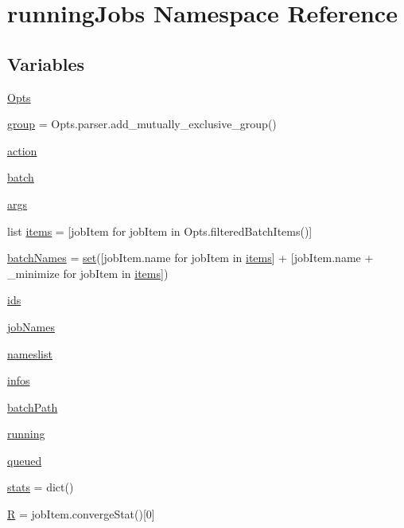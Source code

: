 \hypertarget{namespacerunningJobs}{}\section{running\+Jobs Namespace Reference}
\label{namespacerunningJobs}
\subsection*{Variables}
\begin{DoxyCompactItemize}
\item 
\mbox{\hyperlink{namespacerunningJobs_af3294b73085a8cb379dd4f4a1ff77e1d}{Opts}}
\item 
\mbox{\hyperlink{namespacerunningJobs_a67805e8e0caf8c83496d48a96a06c65c}{group}} = Opts.\+parser.\+add\+\_\+mutually\+\_\+exclusive\+\_\+group()
\item 
\mbox{\hyperlink{namespacerunningJobs_adb058c43d244d0c62dbb4644d85609f1}{action}}
\item 
\mbox{\hyperlink{namespacerunningJobs_a41e81dd05c6ed4532bee5f6630160945}{batch}}
\item 
\mbox{\hyperlink{namespacerunningJobs_a498f2bd71b059a02b3791d5460fed76c}{args}}
\item 
list \mbox{\hyperlink{namespacerunningJobs_ac0608775f65edaa0cff43929a4c7940c}{items}} = \mbox{[}job\+Item for job\+Item in Opts.\+filtered\+Batch\+Items()\mbox{]}
\item 
\mbox{\hyperlink{namespacerunningJobs_a1558158965c9e843da4e4a60ed52a80e}{batch\+Names}} = \mbox{\hyperlink{plotTT_8m_ae2445b699d1845d6abd1418ca39394c0}{set}}(\mbox{[}job\+Item.\+name for job\+Item in \mbox{\hyperlink{namespacerunningJobs_ac0608775f65edaa0cff43929a4c7940c}{items}}\mbox{]} + \mbox{[}job\+Item.\+name + \textquotesingle{}\+\_\+minimize\textquotesingle{} for job\+Item in \mbox{\hyperlink{namespacerunningJobs_ac0608775f65edaa0cff43929a4c7940c}{items}}\mbox{]})
\item 
\mbox{\hyperlink{namespacerunningJobs_a677f12e80dce0689acf714d0135bd618}{ids}}
\item 
\mbox{\hyperlink{namespacerunningJobs_a0a0a08b270feb5c19bc21bfcd276ee9f}{job\+Names}}
\item 
\mbox{\hyperlink{namespacerunningJobs_ac9fe5d5b9c8e3a015df8424ca0dc772a}{nameslist}}
\item 
\mbox{\hyperlink{namespacerunningJobs_a28cc6ccb0472b73ec42776156dbff2dc}{infos}}
\item 
\mbox{\hyperlink{namespacerunningJobs_a0125b6ae31dd325f4991b5a995cca7ec}{batch\+Path}}
\item 
\mbox{\hyperlink{namespacerunningJobs_adea50543919fa21638473c597ee44f38}{running}}
\item 
\mbox{\hyperlink{namespacerunningJobs_a3f9507bb3b4cff54b761a2743acf119d}{queued}}
\item 
\mbox{\hyperlink{namespacerunningJobs_aa8e6c0feeb98c49fc6db0dbc51fc3fb0}{stats}} = dict()
\item 
\mbox{\hyperlink{namespacerunningJobs_a9e8ebb35eba20469c81d9638976487ce}{R}} = job\+Item.\+converge\+Stat()\mbox{[}0\mbox{]}
\end{DoxyCompactItemize}


